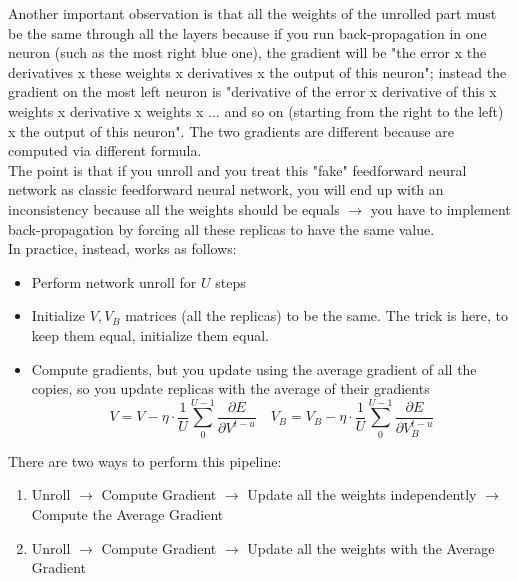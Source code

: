 Another important observation is that all the weights of the unrolled part must be the same through all the layers because if you run back-propagation in one neuron (such as the most right blue one), the gradient will be "the error x the derivatives x these weights x derivatives x the output of this neuron"; instead the gradient on the most left neuron %
is "derivative of the error x derivative of this x weights x derivative x weights x ... and so on (starting from the right to the left) x the output of this neuron". The two gradients %
are different because are computed via different formula. \\
The point is that if you unroll and you treat this "fake" feedforward neural network as classic feedforward neural network, you will end up with an inconsistency because all the weights should be equals %
$\rightarrow$ you have to implement back-propagation by forcing all these replicas to have the same value.\\
In practice, instead, works as follows:
\begin{itemize}
    \item Perform network unroll for $U$ steps
    \item Initialize $V,V_B$ matrices (all the replicas) to be the same. The trick is here, to keep them equal, initialize them equal.
    \item Compute gradients, but you update using the average gradient of all the copies, so you update replicas with the average of their gradients
    $$
    V=V-\eta \cdot \frac{1}{U} \sum_{0}^{U-1} \frac{\partial E}{\partial V^{t-u}}  \quad V_{B}=V_{B}-\eta \cdot \frac{1}{U} \sum_{0}^{U-1} \frac{\partial E}{\partial V_{B}^{t-u}}
    $$
\end{itemize}
There are two ways to perform this pipeline:
\begin{enumerate}
    \item Unroll $\rightarrow$ Compute Gradient  $\rightarrow$ Update all the weights independently  $\rightarrow$ Compute the Average Gradient
    \item Unroll  $\rightarrow$ Compute Gradient  $\rightarrow$ Update all the weights with the Average Gradient
\end{enumerate}{}


